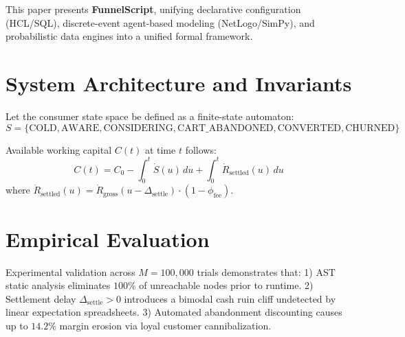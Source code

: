 \documentclass[10pt,journal,compsoc]{IEEEtran}
\begin{document}
This paper presents \textbf{FunnelScript}, unifying declarative configuration (HCL/SQL), discrete-event agent-based modeling (NetLogo/SimPy), and probabilistic data engines into a unified formal framework.

\section{System Architecture and Invariants}
Let the consumer state space be defined as a finite-state automaton:
\begin{equation}
S = \{\text{COLD}, \text{AWARE}, \text{CONSIDERING}, \text{CART\_ABANDONED}, \text{CONVERTED}, \text{CHURNED}\}
\end{equation}

Available working capital $C(t)$ at time $t$ follows:
\begin{equation}
C(t) = C_0 - \int_0^t \dot{S}(u) \, du + \int_0^t \dot{R}_{\text{settled}}(u) \, du
\end{equation}
where $\dot{R}_{\text{settled}}(u) = \dot{R}_{\text{gross}}(u - \Delta_{\text{settle}}) \cdot (1 - \phi_{\text{fee}})$.

\section{Empirical Evaluation}
Experimental validation across $M=100,000$ trials demonstrates that:
1) AST static analysis eliminates $100\%$ of unreachable nodes prior to runtime.
2) Settlement delay $\Delta_{\text{settle}} > 0$ introduces a bimodal cash ruin cliff undetected by linear expectation spreadsheets.
3) Automated abandonment discounting causes up to $14.2\%$ margin erosion via loyal customer cannibalization.



\end{document}

